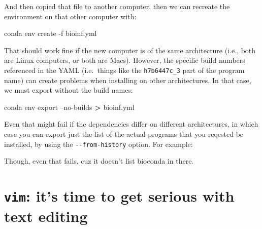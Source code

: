 \documentclass[]{krantz}
\makeatletter
\newenvironment{Shaded}{\begin{snugshade}}{\end{snugshade}}
\newcommand{\ExtensionTok}[1]{#1}
\newcommand{\NormalTok}[1]{#1}
\newcommand{\OperatorTok}[1]{\textcolor[rgb]{0.43,0.43,0.43}{\textbf{#1}}}
\newenvironment{kframe}{%
\medskip{}
\setlength{\fboxsep}{.8em}
 \def\at@end@of@kframe{}%
 \ifinner\ifhmode%
  \def\at@end@of@kframe{\end{minipage}}%
  \begin{minipage}{\columnwidth}%
 \fi\fi%
 \def\FrameCommand##1{\hskip\@totalleftmargin \hskip-\fboxsep
 \colorbox{shadecolor}{##1}\hskip-\fboxsep
     \hskip-\linewidth \hskip-\@totalleftmargin \hskip\columnwidth}%
 \MakeFramed {\advance\hsize-\width
   \@totalleftmargin\z@ \linewidth\hsize
   \@setminipage}}%
 {\par\unskip\endMakeFramed%
 \at@end@of@kframe}
\renewenvironment{Shaded}{\begin{kframe}}{\end{kframe}}
\makeatother
\begin{document}
And then copied that file to another computer, then we can recreate
the environment on that other computer with:

\begin{Shaded}
\begin{Highlighting}[]
\ExtensionTok{conda}\NormalTok{ env create -f bioinf.yml}
\end{Highlighting}
\end{Shaded}

That should work fine if the new computer is of the same architecture (i.e., both
are Linux computers, or both are Macs). However, the specific build numbers
referenced in the YAML (i.e.~things like the \texttt{h7b6447c\_3} part of the program name)
can create problems when installing on other architectures. In that case, we must
export without the build names:

\begin{Shaded}
\begin{Highlighting}[]
\ExtensionTok{conda}\NormalTok{ env export --no-builds }\OperatorTok{>}\NormalTok{ bioinf.yml}
\end{Highlighting}
\end{Shaded}

Even that might fail if the dependencies differ on different architectures,
in which case you can export just the list of the actual programs that
you reqested be installed, by using the \texttt{-\/-from-history} option. For example:

\begin{Shaded}
\end{Shaded}

Though, even that fails, cuz it doesn't list bioconda in there.

\hypertarget{vim-its-time-to-get-serious-with-text-editing}{%
\section{\texorpdfstring{\texttt{vim}: it's time to get serious with text editing}{vim: it's time to get serious with text editing}}\label{vim-its-time-to-get-serious-with-text-editing}}
\end{document}
